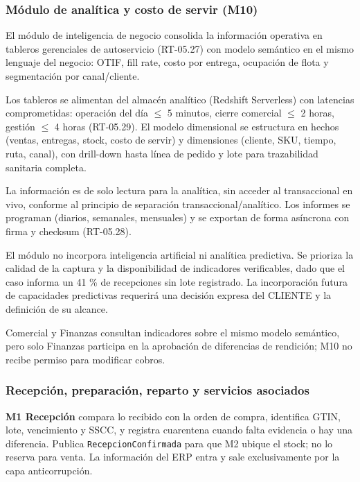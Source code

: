 \subsubsection{Módulo de analítica y costo de servir (M10)}

El módulo de inteligencia de negocio consolida la información operativa en tableros gerenciales de autoservicio (RT-05.27) con modelo semántico en el mismo lenguaje del negocio: OTIF, fill rate, costo por entrega, ocupación de flota y segmentación por canal/cliente.

Los tableros se alimentan del almacén analítico (Redshift Serverless) con latencias comprometidas: operación del día $\leq$ 5 minutos, cierre comercial $\leq$ 2 horas, gestión $\leq$ 4 horas (RT-05.29). El modelo dimensional se estructura en hechos (ventas, entregas, stock, costo de servir) y dimensiones (cliente, SKU, tiempo, ruta, canal), con drill-down hasta línea de pedido y lote para trazabilidad sanitaria completa.

La información es de solo lectura para la analítica, sin acceder al transaccional en vivo, conforme al principio de separación transaccional/analítico. Los informes se programan (diarios, semanales, mensuales) y se exportan de forma asíncrona con firma y checksum (RT-05.28).

El módulo no incorpora inteligencia artificial ni analítica predictiva. Se prioriza la calidad de la captura y la disponibilidad de indicadores verificables, dado que el caso informa un 41 \% de recepciones sin lote registrado. La incorporación futura de capacidades predictivas requerirá una decisión expresa del CLIENTE y la definición de su alcance.

Comercial y Finanzas consultan indicadores sobre el mismo modelo semántico, pero solo Finanzas participa en la aprobación de diferencias de rendición; M10 no recibe permiso para modificar cobros.

\subsubsection{Recepción, preparación, reparto y servicios asociados}

\textbf{M1 Recepción} compara lo recibido con la orden de compra, identifica GTIN, lote, vencimiento y SSCC, y registra cuarentena cuando falta evidencia o hay una diferencia. Publica \texttt{RecepcionConfirmada} para que M2 ubique el stock; no lo reserva para venta. La información del ERP entra y sale exclusivamente por la capa anticorrupción.

